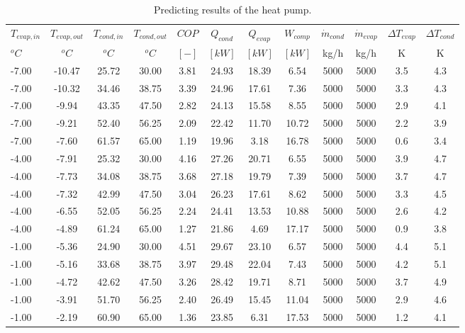\documentclass[english]{SPFShortReport}
\begin{document}
\begin{table}[!ht]
\begin{small}
\caption{Predicting results of the heat pump.}
\begin{center}
\resizebox{12cm}{!} 
{
\begin{tabular}{l | c c c c c c c c c c c } 
\hline
\hline
$T_{evap,in}$ &$T_{evap,out}$ &$T_{cond,in}$ &$T_{cond,out}$ &$COP$ &$Q_{cond}$ &$Q_{evap}$ &$W_{comp}$ &$\dot m_{cond}$ &$\dot m_{evap}$ &$\Delta T_{evap}$ &$\Delta T_{cond}$ \\ 
$^oC$ &$^oC$ &$^oC$ &$^oC$ &$[-]$ &$[kW]$ &$[kW]$ &$[kW]$ &kg/h &kg/h &K &K\\ 
\hline
-7.00 & -10.47 & 25.72 & 30.00 & 3.81 & 24.93 & 18.39 & 6.54 & 5000 & 5000 & 3.5 & 4.3\\ 
-7.00 & -10.32 & 34.46 & 38.75 & 3.39 & 24.96 & 17.61 & 7.36 & 5000 & 5000 & 3.3 & 4.3\\ 
-7.00 & -9.94 & 43.35 & 47.50 & 2.82 & 24.13 & 15.58 & 8.55 & 5000 & 5000 & 2.9 & 4.1\\ 
-7.00 & -9.21 & 52.40 & 56.25 & 2.09 & 22.42 & 11.70 & 10.72 & 5000 & 5000 & 2.2 & 3.9\\ 
-7.00 & -7.60 & 61.57 & 65.00 & 1.19 & 19.96 & 3.18 & 16.78 & 5000 & 5000 & 0.6 & 3.4\\ 
-4.00 & -7.91 & 25.32 & 30.00 & 4.16 & 27.26 & 20.71 & 6.55 & 5000 & 5000 & 3.9 & 4.7\\ 
-4.00 & -7.73 & 34.08 & 38.75 & 3.68 & 27.18 & 19.79 & 7.39 & 5000 & 5000 & 3.7 & 4.7\\ 
-4.00 & -7.32 & 42.99 & 47.50 & 3.04 & 26.23 & 17.61 & 8.62 & 5000 & 5000 & 3.3 & 4.5\\ 
-4.00 & -6.55 & 52.05 & 56.25 & 2.24 & 24.41 & 13.53 & 10.88 & 5000 & 5000 & 2.6 & 4.2\\ 
-4.00 & -4.89 & 61.24 & 65.00 & 1.27 & 21.86 & 4.69 & 17.17 & 5000 & 5000 & 0.9 & 3.8\\ 
-1.00 & -5.36 & 24.90 & 30.00 & 4.51 & 29.67 & 23.10 & 6.57 & 5000 & 5000 & 4.4 & 5.1\\ 
-1.00 & -5.16 & 33.68 & 38.75 & 3.97 & 29.48 & 22.04 & 7.43 & 5000 & 5000 & 4.2 & 5.1\\ 
-1.00 & -4.72 & 42.62 & 47.50 & 3.26 & 28.42 & 19.71 & 8.71 & 5000 & 5000 & 3.7 & 4.9\\ 
-1.00 & -3.91 & 51.70 & 56.25 & 2.40 & 26.49 & 15.45 & 11.04 & 5000 & 5000 & 2.9 & 4.6\\ 
-1.00 & -2.19 & 60.90 & 65.00 & 1.36 & 23.85 & 6.31 & 17.53 & 5000 & 5000 & 1.2 & 4.1\\ 

\end{tabular}}
\end{center}
\end{small}
\end{table}
\end{document}
